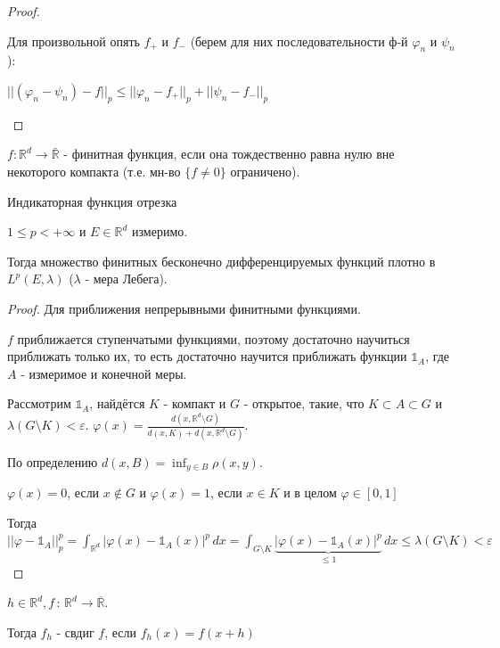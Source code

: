 \begin{proof}
\begin{enumerate}
{            Для произвольной опять $f_{+}$ и $f_{-}$ (берем для них последовательности ф-й $\varphi_n$ и $\psi_n$):

            $|| (\varphi_n - \psi_n) - f ||_p \leq || \varphi_n - f_{+} ||_p + || \psi_n - f_{-} ||_p$
        }
    \end{enumerate}
\end{proof}

\begin{definition}
    $f: \mathbb{R}^d \rightarrow \mathbb{\bar{R}}$ - финитная функция, если она тождественно равна нулю вне некоторого компакта (т.е. мн-во $\{f \neq 0\}$ ограничено).
    \begin{example}
        Индикаторная функция отрезка
    \end{example}
\end{definition}

\begin{theorem}
    $1 \leqslant p < +\infty$ и $E \in \mathbb{R}^d$ измеримо.

    Тогда множество финитных бесконечно дифференцируемых функций плотно в $L^p (E, \lambda)$ ($\lambda$ - мера Лебега).
\end{theorem}

\begin{proof}
    Для приближения непрерывными финитными функциями.

    $f$ приближается ступенчатыми функциями, поэтому достаточно научиться приближать только их, то есть
    достаточно научится приближать функции $\mathds{1}_A$, где $A$ - измеримое и конечной меры.

    Рассмотрим $\mathds{1}_A$, найдётся $K$ - компакт и $G$ - открытое, такие, что $K \subset A \subset G$ и
    $\lambda (G \setminus K) < \varepsilon$. $\varphi (x) = \frac{d(x, \mathbb{R}^d \setminus G)}{d(x, K) + d(x, \mathbb{R}^d \setminus G)}$.

    По определению $d(x, B) = \inf_{y \in B} \rho (x, y)$.

    $\varphi(x) = 0$, если $x \not \in G$ и $\varphi(x) = 1$, если $x \in K$ и в целом $\varphi \in [0, 1]$

    Тогда $||\varphi - \mathds{1}_A||_p^p = \int_{\mathbb{R}^d} |\varphi (x) - \mathds{1}_A (x)|^p \, dx =
    \int_{G \setminus K} \underbrace{|\varphi (x) - \mathds{1}_A(x) |^p}_{\leqslant 1} \, dx \leqslant \lambda (G \setminus K) < \varepsilon$
\end{proof}

\begin{definition}
    $h \in \mathbb{R}^d, f \, : \, \mathbb{R}^d \to \overline{\mathbb{R}}$.

    Тогда $f_h$ - свдиг $f$, если $f_h(x) = f(x + h)$
\end{definition}

